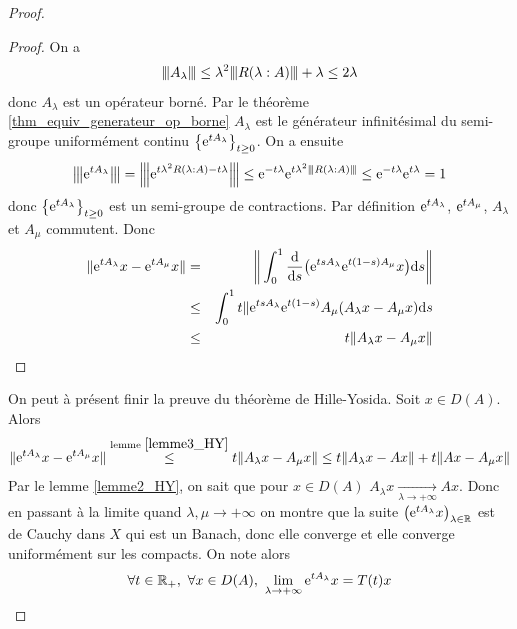\begin{proof}
    \begin{proof}
        On a 
        \begin{eqnarray*}
            {\left\vert\kern-0.25ex\left\vert \kern-0.25ex\left\vert A_{\lambda} \right\vert\kern-0.25ex\right\vert\kern-0.25ex\right\vert} \leq \lambda^2{\left\vert\kern-0.25ex\left\vert \kern-0.25ex\left\vert R(\lambda:A) \right\vert\kern-0.25ex\right\vert\kern-0.25ex\right\vert}+\lambda \leq 2\lambda
        \end{eqnarray*}
        donc $A_{\lambda}$ est un opérateur borné. Par le théorème \ref{thm_equiv_generateur_op_borne} $A_{\lambda}$ est le générateur infinitésimal du semi-groupe uniformément continu $\big\{\mathrm{e}^{tA_{\lambda}}\big\}_{t \geq 0}$. On a ensuite 
        \begin{equation*}
            {\left\vert\kern-0.25ex\left\vert \kern-0.25ex\left\vert \mathrm{e}^{tA_{\lambda}} \right\vert\kern-0.25ex\right\vert\kern-0.25ex\right\vert} = {\left\vert\kern-0.25ex\left\vert \kern-0.25ex\left\vert \mathrm{e}^{t\lambda^2R(\lambda:A)-t\lambda} \right\vert\kern-0.25ex\right\vert\kern-0.25ex\right\vert} \leq \mathrm{e}^{-t\lambda}\mathrm{e}^{t\lambda^2{\left\vert\kern-0.25ex\left\vert \kern-0.25ex\left\vert R(\lambda:A) \right\vert\kern-0.25ex\right\vert\kern-0.25ex\right\vert}} \leq \mathrm{e}^{-t\lambda}\mathrm{e}^{t\lambda}=1
        \end{equation*}
        donc $\big\{\mathrm{e}^{tA_{\lambda}}\big\}_{t \geq 0}$ est un semi-groupe de contractions. Par définition $\mathrm{e}^{tA_{\lambda}}$, $\mathrm{e}^{tA_{\mu}}$, $A_{\lambda}$ et $A_{\mu}$ commutent. Donc 
        \begin{eqnarray*}
            \|\mathrm{e}^{tA_{\lambda}}x-\mathrm{e}^{tA_{\mu}}x\| &=& \bigg\| \int_0^1 \frac{\mathrm{d}}{\mathrm{d} s}\big(\mathrm{e}^{tsA_{\lambda}}\mathrm{e}^{t(1-s)A_{\mu}}x\big)\mathrm{d} s\bigg\| \\
            &\leq& \int_0^1 t \|\mathrm{e}^{tsA_{\lambda}}\mathrm{e}^{t(1-s)}A_{\mu}(A_{\lambda}x-A_{\mu}x)\mathrm{d} s \\
            &\leq& t\|A_{\lambda}x-A_{\mu}x\|
        \end{eqnarray*}
    \end{proof}
    On peut à présent finir la preuve du théorème de Hille-Yosida. Soit $x \in D(A)$. Alors 
    \begin{eqnarray*}
        \|\mathrm{e}^{tA_{\lambda}}x-\mathrm{e}^{tA_{\mu}}x\| \overset{\text{lemme } \ref{lemme3_HY}}{\leq} t \|A_{\lambda}x-A_{\mu}x\| \leq t\|A_{\lambda}x-Ax\| + t \|Ax-A_{\mu}x\|
    \end{eqnarray*}
    Par le lemme \ref{lemme2_HY}, on sait que pour $x \in D(A)$ $A_{\lambda}x \underset{\lambda \to +\infty}{\longrightarrow} Ax$. Donc en passant à la limite quand $\lambda, \mu \to +\infty$ on montre que la suite $\big(\mathrm{e}^{tA_{\lambda}}x\big)_{\lambda \in \mathbb{R}}$ est de Cauchy dans $X$ qui est un Banach, donc elle converge et elle converge uniformément sur les compacts. On note alors 
    \begin{equation*}
        \forall t \in \mathbb{R}_+, \ \forall x \in D(A), \ \lim_{\lambda \to +\infty} \mathrm{e}^{tA_{\lambda}}x = T(t)x
    \end{equation*}

\end{proof}

